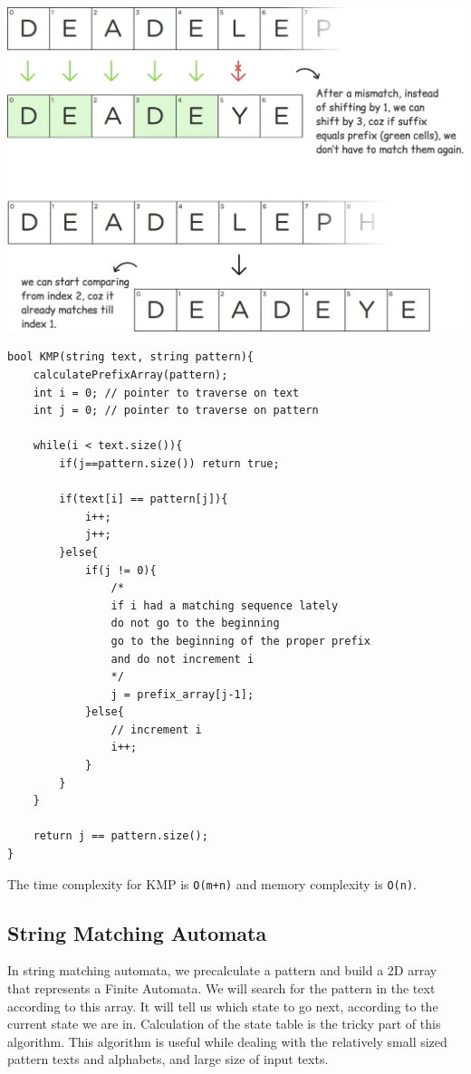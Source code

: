 \documentclass[12pt]{article}
\begin{document}
        \includegraphics[width=\linewidth/1]{kmp.jpeg}
        
        \newpage
        
        \begin{verbatim}
bool KMP(string text, string pattern){
    calculatePrefixArray(pattern);
    int i = 0; // pointer to traverse on text
    int j = 0; // pointer to traverse on pattern

    while(i < text.size()){
        if(j==pattern.size()) return true;

        if(text[i] == pattern[j]){
            i++;
            j++;
        }else{
            if(j != 0){
                /*
                if i had a matching sequence lately
                do not go to the beginning
                go to the beginning of the proper prefix
                and do not increment i
                */ 
                j = prefix_array[j-1];
            }else{
                // increment i
                i++;
            }
        }
    }

    return j == pattern.size();
}
        \end{verbatim}
        
        The time complexity for KMP is \texttt{O(m+n)} and memory complexity is \texttt{O(n)}.
        
        \subsection{String Matching Automata}
        In string matching automata, we precalculate a pattern and build a 2D array that represents a Finite Automata. We will search for the pattern in the text according to this array. It will tell us which state to go next, according to the current state we are in. Calculation of the state table is the tricky part of this algorithm. This algorithm is useful while dealing with the relatively small sized pattern texts and alphabets, and large size of input texts.
        
\end{document}
